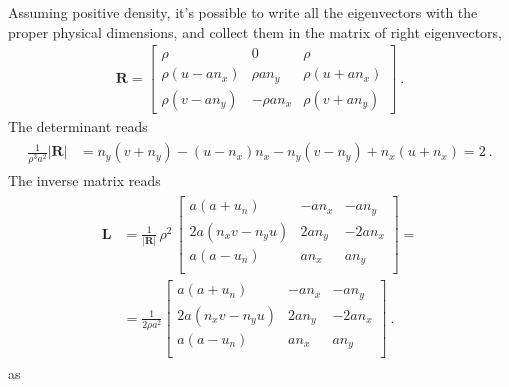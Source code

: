 \documentclass[letterpaper,10pt,english]{jupyterBook}
\begin{document}
\sphinxAtStartPar
Assuming positive density, it’s possible to write all the eigenvectors with the proper physical dimensions, and collect them in the matrix of right eigenvectors,
\begin{equation*}
\begin{split}\mathbf{R} = \begin{bmatrix}
  \rho & 0 & \rho \\
  \rho ( u - a n_x ) &   \rho a n_y &  \rho ( u + a n_x ) \\ 
  \rho ( v - a n_y ) & - \rho a n_x &  \rho ( v + a n_y ) 
\end{bmatrix} \ .\end{split}
\end{equation*}
\sphinxAtStartPar
The determinant reads
\begin{equation*}
\begin{split}\begin{aligned}
  \frac{1}{\rho^3 a^2} |\mathbf{R}|
  & =   n_y ( v + n_y ) - ( u - n_x ) n_x - n_y ( v - n_y ) + n_x ( u + n_x ) = 2 \ .
\end{aligned}\end{split}
\end{equation*}
\sphinxAtStartPar
The inverse matrix reads
\begin{equation*}
\begin{split}\begin{aligned}
\mathbf{L} 
& = \frac{1}{|\mathbf{R}|} \, \rho^2 \,
\begin{bmatrix}
   a ( a + u_n )       &  - a n_x  & -   a n_y \\
   2a( n_x v - n_y u ) & 2 a n_ y  & - 2 a n_x \\
   a ( a - u_n )       &    a n_x  &     a n_y \\
\end{bmatrix} = \\
& =
\frac{1}{2 \rho a^2}
\begin{bmatrix}
   a ( a + u_n )       &  - a n_x  & -   a n_y \\
   2a( n_x v - n_y u ) & 2 a n_ y  & - 2 a n_x \\
   a ( a - u_n )       &    a n_x  &     a n_y \\
\end{bmatrix} \ .
\end{aligned}\end{split}
\end{equation*}
\sphinxAtStartPar
as
\end{document}
